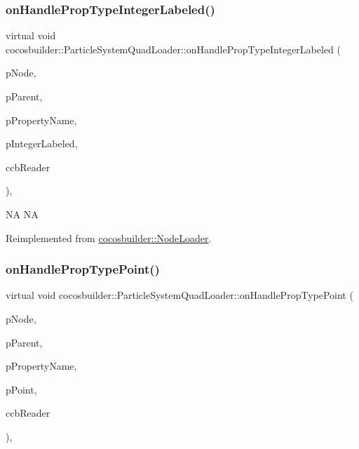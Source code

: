 \subsubsection{\texorpdfstring{on\+Handle\+Prop\+Type\+Integer\+Labeled()}{onHandlePropTypeIntegerLabeled()}\hspace{0.1cm}{\footnotesize\ttfamily [2/2]}}
{\footnotesize\ttfamily virtual void cocosbuilder\+::\+Particle\+System\+Quad\+Loader\+::on\+Handle\+Prop\+Type\+Integer\+Labeled (\begin{DoxyParamCaption}\item[{cocos2d\+::\+Node $\ast$}]{p\+Node,  }\item[{cocos2d\+::\+Node $\ast$}]{p\+Parent,  }\item[{const char $\ast$}]{p\+Property\+Name,  }\item[{int}]{p\+Integer\+Labeled,  }\item[{\hyperlink{classcocosbuilder_1_1CCBReader}{C\+C\+B\+Reader} $\ast$}]{ccb\+Reader }\end{DoxyParamCaption})\hspace{0.3cm}{\ttfamily [protected]}, {\ttfamily [virtual]}}

NA  NA 

Reimplemented from \hyperlink{classcocosbuilder_1_1NodeLoader}{cocosbuilder\+::\+Node\+Loader}.

\mbox{\label{classcocosbuilder_1_1ParticleSystemQuadLoader_a4889d27aac2073ebee6c9648fbf59c1f}} 
\subsubsection{\texorpdfstring{on\+Handle\+Prop\+Type\+Point()}{onHandlePropTypePoint()}\hspace{0.1cm}{\footnotesize\ttfamily [1/2]}}
{\footnotesize\ttfamily virtual void cocosbuilder\+::\+Particle\+System\+Quad\+Loader\+::on\+Handle\+Prop\+Type\+Point (\begin{DoxyParamCaption}\item[{cocos2d\+::\+Node $\ast$}]{p\+Node,  }\item[{cocos2d\+::\+Node $\ast$}]{p\+Parent,  }\item[{const char $\ast$}]{p\+Property\+Name,  }\item[{cocos2d\+::\+Vec2}]{p\+Point,  }\item[{\hyperlink{classcocosbuilder_1_1CCBReader}{C\+C\+B\+Reader} $\ast$}]{ccb\+Reader }\end{DoxyParamCaption})\hspace{0.3cm}{\ttfamily [protected]}, {\ttfamily [virtual]}}

